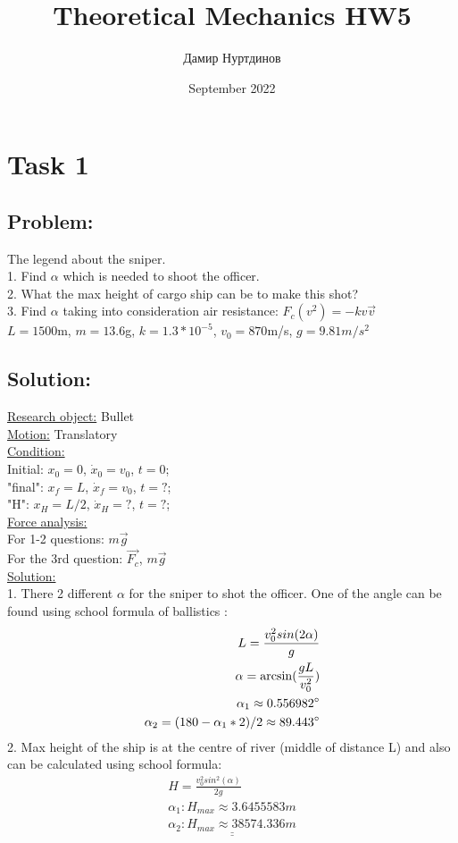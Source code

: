\documentclass[a4paper,11pt,oneside,article]{memoir}
\title{Theoretical Mechanics HW5}
\author{Дамир Нуртдинов}
\date{September 2022}
\def\doubleunderline#1{\underline{\underline{#1}}}
\begin{document}
\section*{Task 1}
\subsection{Problem:}
The legend about the sniper.\\
1. Find $\alpha$ which is needed to shoot the officer.\\
2. What the max height of cargo ship can be to make this shot?\\
3. Find $\alpha$ taking into consideration air resistance: $F_c(v^2) = -kv\Vec{v}$\\
$L = 1500$m, $m = 13.6$g, $k=1.3 * 10^{-5}$, $v_0 = 870$m/s, $g = 9.81 m/s^2$
\subsection{Solution:}
\underline{Research object:} Bullet\\
\underline{Motion:} Translatory\\
\underline{Condition:}\\
Initial: $x_0 = 0$, $\dot x_0 = v_0$, $t=0$;\\
"final": $x_f = L$, $\dot x_f = v_0$, $t=?$;\\
"H": $x_H = L/2$, $\dot x_H = ?$, $t=?$;\\
\underline{Force analysis:}\\
For 1-2 questions: $m\Vec{g}$\\
For the 3rd question: $\Vec{F_c}$, $m\Vec{g}$\\
\underline{Solution:}\\
1. There 2 different $\alpha$ for the sniper to shot the officer. One of the angle can be found using school formula of ballistics :
\begin{equation}
    \begin{split}
        L = \frac{v^2_0 sin(2\alpha)}{g}\\
        \alpha = \arcsin(\frac{gL}{v^2_0})\\
        \alpha_1 \approx 0.556982 \degree\\
        \alpha_2 = (180 - \alpha_1*2)/2 \approx 89.443\degree
    \end{split}
\end{equation}
2. Max height of the ship is at the centre of river (middle of distance L) and also can be calculated using school formula:
\begin{equation}
    \begin{split}
        H = \frac{v^2_0 sin^2(\alpha)}{2g}\\
        \alpha_1: H_{max} \approx 3.6455583m\\
        \doubleunderline{\alpha_2: H_{max} \approx 38574.336m}\\
    \end{split}
\end{equation}
\end{document}
